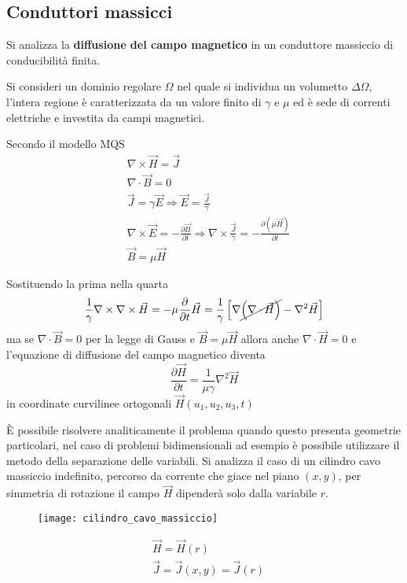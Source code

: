 
\subsection{Conduttori massicci}
Si analizza la \textbf{diffusione del campo magnetico} in un conduttore massiccio di conducibilità finita.

Si consideri un dominio regolare $\Omega$ nel quale si individua un volumetto $\Delta\Omega$, l'intera
regione è caratterizzata da un valore finito di $\gamma$ e $\mu$ ed è sede di correnti elettriche e investita
da campi magnetici.

Secondo il modello MQS
$$
\begin{aligned}
&\nabla\times\vec{H} = \vec{J}\\
&\nabla\cdot \vec{B} = 0 \\
&\vec{J} = \gamma\vec{E} \Rightarrow \vec{E} = \frac{\vec{J}}{\gamma}\\
&\nabla\times\vec{E} = -\frac{\partial \vec{B}}{\partial t} \Rightarrow \nabla\times\frac{\vec{J}}{\gamma} = -\frac{\partial \left(\mu\vec{H}\right)}{\partial t} \\
&\vec{B} = \mu\vec{H}
\end{aligned}
$$

Sostituendo la prima nella quarta
$$
\frac{1}{\gamma} \nabla\times\nabla\times\vec{H} = -\mu \frac{\partial}{\partial t} \vec{H} = \frac{1}{\gamma}
\left[\nabla\cancel{\left(\nabla\cdot\vec{H}\right)} - \nabla^2\vec{H}\right]
$$
ma se $\nabla\cdot\vec{B} = 0$ per la legge di Gauss e $\vec{B} = \mu\vec{H}$ allora anche $\nabla\cdot\vec{H} = 0$
e l'equazione di diffusione del campo magnetico diventa
$$
\frac{\partial\vec{H}}{\partial t} = \frac{1}{\mu\gamma} \nabla^2 \vec{H}
$$
in coordinate curvilinee ortogonali $ \vec{H}\left(u_1,u_2,u_3,t\right)$

È possibile risolvere analiticamente il problema quando questo presenta geometrie particolari,
nel caso di problemi bidimensionali ad esempio è possibile utilizzare il metodo della separazione delle
variabili.
\newpage
Si analizza il caso di un cilindro cavo massiccio indefinito, percorso da corrente che giace nel piano $(x,y)$,
per simmetria di rotazione il campo $\vec{H}$ dipenderà solo dalla variabile $r$.
\begin{figure}[H]
\centering
\texttt{[image: cilindro\_cavo\_massiccio]}
\end{figure}
\begin{align*}
&\vec{H} = \vec{H} (r)\\
&\vec{J} = \vec{J}(x,y) = \vec{J}(r)
\end{align*}

